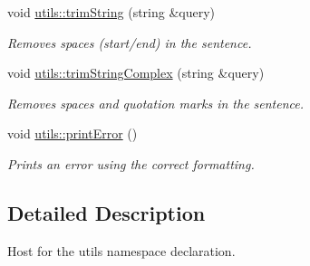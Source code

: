 \begin{DoxyCompactItemize}
void \hyperlink{namespaceutils_a9f184d101ac739ab058355ab5413ca9a}{utils\+::trim\+String} (string \&query)
\begin{DoxyCompactList}\small\item\em Removes spaces (start/end) in the sentence. \end{DoxyCompactList}\item 
void \hyperlink{namespaceutils_a0362c7510f0bb0c4449031f897626696}{utils\+::trim\+String\+Complex} (string \&query)
\begin{DoxyCompactList}\small\item\em Removes spaces and quotation marks in the sentence. \end{DoxyCompactList}\item 
void \hyperlink{namespaceutils_afd76dd21b41c50ce7396e30fb5d8d75b}{utils\+::print\+Error} ()
\begin{DoxyCompactList}\small\item\em Prints an error using the correct formatting. \end{DoxyCompactList}\end{DoxyCompactItemize}


\subsection{Detailed Description}
Host for the utils namespace declaration. 

